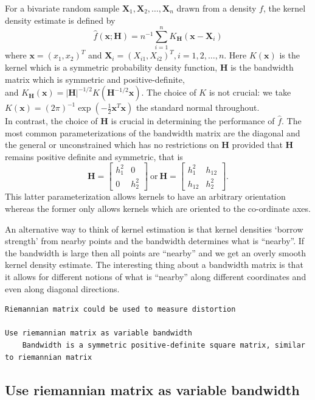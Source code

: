 \documentclass[11pt,a4paper,]{article}
\begin{document}
For a bivariate random sample \(\pmb X_1, \pmb X_2, \ldots, \pmb X_n\)
drawn from a density \(f\),
the kernel density estimate is defined by
\[
\hat{f} (\pmb x; \pmb H) = n^{-1}\sum_{i=1}^n K_{\pmb H} ( \pmb x - \pmb{X}_i)
\]
where \(\pmb x = (x_1, x_2)^T\) and \(\pmb{X}_i = (X_{i1}, X_{i2})^T, i = 1, 2, \ldots, n\). Here
\(K(\pmb x)\) is the kernel which is a symmetric probability density function,
\(\pmb H\) is the bandwidth matrix which is symmetric and positive-definite,\\
and \(K_{\pmb H}(\pmb x) = |\pmb H|^{-1/2} K( \pmb H^{-1/2} \pmb x)\).
The choice of \(K\) is not crucial: we take
\(K(\pmb x) = (2\pi)^{-1} \exp(-\tfrac{1}{2} \pmb x^T \pmb x)\) the standard normal
throughout.\\
In contrast, the choice of \(\pmb H\) is crucial in determining the performance of \(\hat f\).
The most common parameterizations of the bandwidth matrix
are the diagonal and the
general or unconstrained which has no restrictions on \(\pmb H\)
provided that \(\pmb H\) remains positive definite and symmetric, that is
\[
\pmb H = \begin{bmatrix}h_1^2 & 0 \\0 & h_2^2 \end{bmatrix}
\ \mathrm{or} \ 
\pmb H = \begin{bmatrix}h_1^2 & h_{12} \\ h_{12}  & h_2^2 \end{bmatrix}.
\]
This latter parameterization allows kernels to have an arbitrary orientation
whereas the former only allows kernels which are oriented to the
co-ordinate axes.

An alternative way to think of kernel estimation is that kernel densities `borrow strength' from nearby points and the bandwidth determines what is ``nearby''. If the bandwidth is large then all points are ``nearby'' and we get an overly smooth kernel density estimate. The interesting thing about a bandwidth matrix is that it allows for different notions of what is ``nearby'' along different coordinates and even along diagonal directions.

\begin{verbatim}
Riemannian matrix could be used to measure distortion

Use riemannian matrix as variable bandwidth
    Bandwidth is a symmetric positive-definite square matrix, similar to riemannian matrix
\end{verbatim}

\hypertarget{use-riemannian-matrix-as-variable-bandwidth}{%
\subsection{Use riemannian matrix as variable bandwidth}\label{use-riemannian-matrix-as-variable-bandwidth}}
\end{document}
